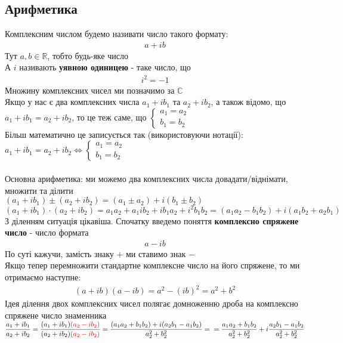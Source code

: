 \documentclass[a4paper, 14pt]{extarticle}
\def\bigline{\vspace{5mm}\\}
\theoremstyle{theoremdd}
\theoremstyle{theoremdd}
\theoremstyle{theoremdd}
\theoremstyle{theoremdd}
\theoremstyle{theoremdd}
\theoremstyle{theoremdd}
\theoremstyle{theoremdd}
\theoremstyle{theoremdd}
\begin{document}
\subsection{Арифметика}
Комплексним числом будемо називати число такого формату:
\begin{align*}
a + ib
\end{align*}
Тут $a,b \in \mathbb{R}$, тобто будь-яке число\\
А $i$ називають \textbf{уявною одиницею} - таке число, що
\begin{align*}
i^2 = -1
\end{align*}
Множину комплексних чисел ми позначимо за $\mathbb{C}$
\bigline
Якщо у нас є два комплексних числа $a_1 + ib_1$ та $a_2 + ib_2$, а також відомо, що\\
$a_1 + ib_1 = a_2 + ib_2$, то це теж саме, що $\begin{cases} a_1 = a_2 \\ b_1 = b_2 \end{cases}$\\
Більш математично це записується так (використовуючи нотації):\\
$a_1 + ib_1 = a_2 + ib_2 \iff \begin{cases} a_1 = a_2 \\ b_1 = b_2 \end{cases}$\\
\bigline
Основна арифметика: ми можемо два комплексних числа довадати/віднімати, множити та ділити\\
$(a_1+ib_1) \pm (a_2 + ib_2) = (a_1 \pm a_2) + i(b_1 \pm b_2)$
\bigline
$(a_1+ib_1) \cdot (a_2 + ib_2) = a_1 a_2 + a_1 i b_2 + ib_1 a_2 + i^2 b_1 b_2 = (a_1a_2-b_1b_2) + i(a_1b_2+a_2b_1)$
\bigline
З діленням ситуація цікавіша. Спочатку введемо поняття \textbf{комплексно спряжене число} - число формата
\begin{align*}
a - ib
\end{align*}
По суті кажучи, замість знаку $+$ ми ставимо знак $-$\\
Якщо тепер перемножити стандартне комплексне число на його спряжене, то ми отримаємо наступне:
\begin{align*}
(a+ib)(a-ib) = a^2 - (ib)^2 = a^2 + b^2
\end{align*}
Ідея ділення двох комплексних чисел полягає домноженню дроба на комплексно спряжене число знаменника\\
$\dfrac{a_1+ ib_1}{a_2 + ib_2} = \dfrac{(a_1 + ib_1)\textcolor{red}{(a_2-ib_2)}}{(a_2+ib_2)\textcolor{red}{(a_2-ib_2)}} = \dfrac{(a_1a_2 + b_1b_2) + i(a_2b_1-a_1b_2)}{a_2^2 + b_2^2} = \\ = \dfrac{a_1a_2 + b_1b_2}{a_2^2 + b_2^2} + i \dfrac{a_2 b_1 - a_1 b_2}{a_2^2 + b_2^2}$
\bigline
\end{document}

